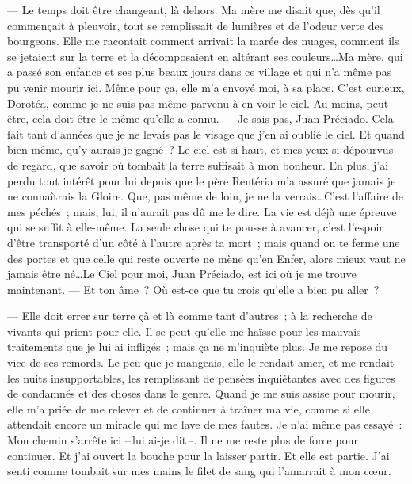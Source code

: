  --- Le temps doit être changeant, là dehors. Ma mère me disait que, dès qu’il commençait à pleuvoir, tout se remplissait de lumières et de l’odeur verte des bourgeons. Elle me racontait comment arrivait la marée des nuages, comment ils se jetaient sur la terre et la décomposaient en altérant ses couleurs\ldots Ma mère, qui a passé son enfance et ses plus beaux jours dans ce village et qui n’a même pas pu venir mourir ici. Même pour ça, elle m’a envoyé moi, à sa place. C’est curieux, Dorotéa, comme je ne suis pas même parvenu à en voir le ciel. Au moins, peut-être, cela doit être le même qu’elle a connu.
\pend
%
\pstart
  --- Je sais pas, Juan Préciado. Cela fait tant d’années que je ne levais pas le visage que j’en ai oublié le ciel. Et quand bien même, qu’y aurais-je gagné ? Le ciel est si haut, et mes yeux si dépourvus de regard, que savoir où tombait la terre suffisait à mon bonheur. En plus, j’ai perdu tout intérêt pour lui depuis que le père Rentéria m’a assuré que jamais je ne connaîtrais la Gloire. Que, pas même de loin, je ne la verrais\ldots C’est l’affaire de mes péchés ; mais, lui, il n’aurait pas dû me le dire. La vie est déjà une épreuve qui se suffit à elle-même. La seule chose qui te pousse à avancer, c’est l’espoir d’être transporté d’un côté à l’autre après ta mort ; mais quand on te ferme une des portes et que celle qui reste ouverte ne mène qu’en Enfer, alors mieux vaut ne jamais être né\ldots Le Ciel pour moi, Juan Préciado, est ici où je me trouve maintenant.
\pend
%
\pstart
  --- Et ton âme ? Où est-ce que tu crois qu’elle a bien pu aller ?

  --- Elle doit errer sur terre çà et là comme tant d’autres ; à la recherche de vivants qui prient pour elle. Il se peut qu’elle me haïsse pour les mauvais traitements que je lui ai infligés ; mais ça ne m’inquiète plus. Je me repose du vice de ses remords. Le peu que je mangeais, elle le rendait amer, et me rendait les nuits insupportables, les remplissant de pensées inquiétantes avec des figures de condamnés et des choses dans le genre. Quand je me suis assise pour mourir, elle m’a priée de me relever et de continuer à traîner ma vie, comme si elle attendait encore un miracle qui me lave de mes fautes. Je n’ai même pas essayé : \og{}Mon chemin s’arrête ici --\,lui ai-je dit\,--. Il ne me reste plus de force pour continuer.\fg{} Et j’ai ouvert la bouche pour la laisser partir. Et elle est partie. J’ai senti comme tombait sur mes mains le filet de sang qui l’amarrait à mon cœur.
\pend
